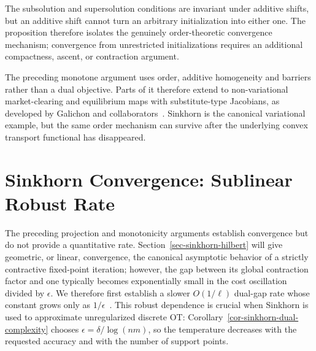 The subsolution and supersolution conditions are invariant under additive shifts, but an additive shift cannot turn an arbitrary initialization into either one. The proposition therefore isolates the genuinely order-theoretic convergence mechanism; convergence from unrestricted initializations requires an additional compactness, ascent, or contraction argument.

\begin{rem}
	The preceding monotone argument uses order, additive homogeneity and barriers rather than a dual objective. Parts of it therefore extend to non-variational market-clearing and equilibrium maps with substitute-type Jacobians, as developed by Galichon and collaborators~\cite{GalichonJacquet2024Substitutability,GalichonSamuelsonVernet2022Monotone}. Sinkhorn is the canonical variational example, but the same order mechanism can survive after the underlying convex transport functional has disappeared.
\end{rem}


\section{Sinkhorn Convergence: Sublinear Robust Rate}

The preceding projection and monotonicity arguments establish convergence but do not provide a quantitative rate. Section~\ref{sec-sinkhorn-hilbert} will give geometric, or linear, convergence, the canonical asymptotic behavior of a strictly contractive fixed-point iteration; however, the gap between its global contraction factor and one typically becomes exponentially small in the cost oscillation divided by $\epsilon$. We therefore first establish a slower $O(1/\ell)$ dual-gap rate whose constant grows only as $1/\epsilon$~\cite{peyre2026robust,altschuler2017near,pmlr-v80-dvurechensky18a}. This robust dependence is crucial when Sinkhorn is used to approximate unregularized discrete OT: Corollary~\ref{cor-sinkhorn-dual-complexity} chooses $\epsilon=\delta/\log(nm)$, so the temperature decreases with the requested accuracy and with the number of support points.


